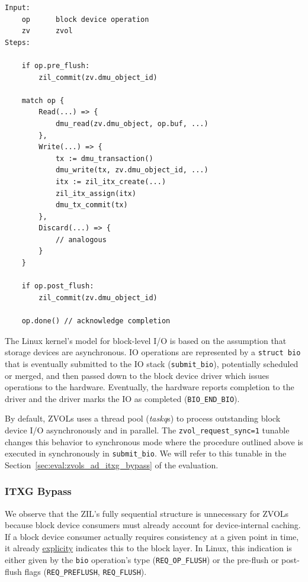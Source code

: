 \documentclass[12pt,a4paper,twoside]{book}
\begin{document}
\begin{lstlisting}[style=figurepseudocode]
Input:
    op      block device operation
    zv      zvol
Steps:

    if op.pre_flush:
        zil_commit(zv.dmu_object_id)

    match op {
        Read(...) => {
            dmu_read(zv.dmu_object, op.buf, ...)
        },
        Write(...) => {
            tx := dmu_transaction()
            dmu_write(tx, zv.dmu_object_id, ...)
            itx := zil_itx_create(...)
            zil_itx_assign(itx)
            dmu_tx_commit(tx)
        },
        Discard(...) => {
            // analogous
        }
    }

    if op.post_flush:
        zil_commit(zv.dmu_object_id)

    op.done() // acknowledge completion

\end{lstlisting}

The Linux kernel's model for block-level I/O is based on the assumption that storage devices are asynchronous.
IO operations are represented by a \lstinline[style=figurepseudocode]{struct bio} that is eventually submitted to the IO stack (\lstinline{submit_bio}), potentially scheduled or merged, and then passed down to the block device driver which issues operations to the hardware.
Eventually, the hardware reports completion to the driver and the driver marks the IO as completed (\lstinline{BIO_END_BIO}).

By default, ZVOLs uses a thread pool (\textit{taskq}s) to process outstanding block device I/O asynchronously and in parallel.
The \lstinline{zvol_request_sync=1} tunable changes this behavior to synchronous mode where the procedure outlined above is executed in synchronously in \lstinline{submit_bio}.
We will refer to this tunable in the Section~\ref{sec:eval:zvols_ad_itxg_bypass} of the evaluation.

\subsubsection{ITXG Bypass}

We observe that the ZIL's fully sequential structure is unnecessary for ZVOLs because block device consumers must already account for device-internal caching.
If a block device consumer actually requires consistency at a given point in time, it already \underline{explicity} indicates this to the block layer.
In Linux, this indication is either given by the \lstinline{bio} operation's type (\lstinline{REQ_OP_FLUSH}) or the pre-flush or post-flush flags (\lstinline{REQ_PREFLUSH}, \lstinline{REQ_FLUSH}).
\end{document}
